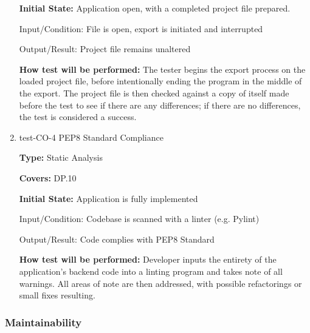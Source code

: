 \documentclass[12pt, titlepage]{article}
\begin{document}
\begin{enumerate}
\textbf{Initial State:} Application open, with a completed project file prepared.
					
Input/Condition: File is open, export is initiated and interrupted
					
Output/Result: Project file remains unaltered
					
\textbf{How test will be performed:} The tester begins the export process on the loaded project file, before intentionally ending the program
in the middle of the export. The project file is then checked against a copy of itself made before the test to see if there are any differences;
if there are no differences, the test is considered a success. 

\item{test-CO-4 PEP8 Standard Compliance\\}

\textbf{Type:} Static Analysis

\textbf{Covers:} DP.10
					
\textbf{Initial State:} Application is fully implemented
					
Input/Condition: Codebase is scanned with a linter (e.g. Pylint) %
					
Output/Result: Code complies with PEP8 Standard
					
\textbf{How test will be performed:} Developer inputs the entirety of the application's backend code into a linting program and takes note of all
warnings. All areas of note are then addressed, with possible refactorings or small fixes resulting.

\end{enumerate}

\subsubsection{Maintainability}
\end{document}
